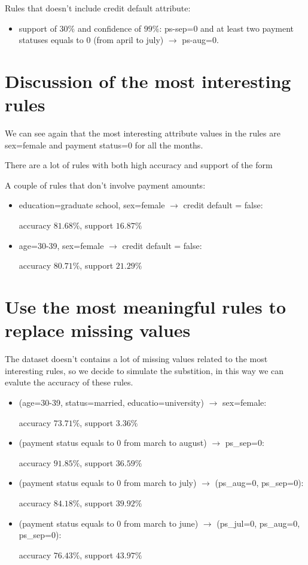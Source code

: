 Rules that doesn't include credit default attribute:

\begin{itemize}
  \item support of $30\%$ and confidence of $99\%$: 
  ps-sep=0 and at least two payment statuses equals to 0 (from april to july) $\rightarrow$ ps-aug=0.
\end{itemize}

\section{Discussion of the most interesting rules}

We can see again that the most interesting attribute values in the rules are sex=female and payment status=0 for all the months. 

\smallskip

There are a lot of rules with both high accuracy and support of the form 

\smallskip

A couple of rules that don't involve payment amounts:

\begin{itemize}
  \item education=graduate school, sex=female $\rightarrow$ credit default = false:
  
    \tab accuracy $81.68\%$, support $16.87\%$
  \item age=30-39, sex=female $\rightarrow$ credit default = false:
  
    \tab accuracy $80.71\%$, support $21.29\%$
\end{itemize}

\section{Use the most meaningful rules to replace missing values}

The dataset doesn't contains a lot of missing values related to the most interesting rules, so we decide to simulate the substition, in this way we can evalute the accuracy of these rules.

\begin{itemize}
  \item (age=30-39, status=married, educatio=university) $\rightarrow$ sex=female:
  
    \tab accuracy $73.71\%$, support $3.36\%$
  \item (payment status equals to 0 from march to august) $\rightarrow$ ps\_sep=0:
  
    \tab accuracy $91.85\%$, support $36.59\%$
  \item (payment status equals to 0 from march to july) $\rightarrow$ (ps\_aug=0, ps\_sep=0):
  
    \tab accuracy $84.18\%$, support $39.92\%$

  \item (payment status equals to 0 from march to june) $\rightarrow$ (ps\_jul=0, ps\_aug=0, ps\_sep=0):
  
    \tab accuracy $76.43\%$, support $43.97\%$

\end{itemize}

